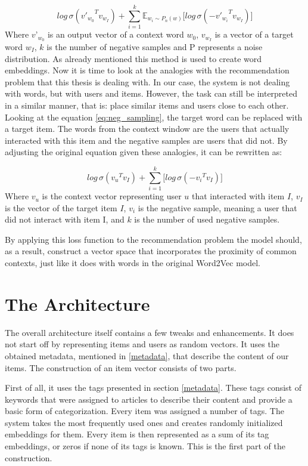 \begin{equation} \label{eq:neg_sampling}
    log \, \sigma ({{v'}_{w_0}}^T v_{w_I}) + \sum_{i=1}^k \mathbb{E}_{w_i \sim P_n(w)} \Big[log \, \sigma (-{{v'}_{w_i}}^T v_{w_I})\Big]
\end{equation}
Where ${v’}_{w_0}$ is an output vector of a context word $w_0$, $v_{w_I}$ is a vector of a target word $w_I$, $k$ is the number of negative samples and P represents a noise distribution. 
As already mentioned this method is used to create word embeddings. Now it is time to look at the analogies with the recommendation problem that this thesis is dealing with. 
In our case, the system is not dealing with words, but with users and items. However, the task can still be interpreted in a similar manner, that is: place similar items and users close to each other. Looking at the equation \ref{eq:neg_sampling}, the target word can be replaced with a target item. The words from the context window are the users that actually interacted with this item and the negative samples are users that did not. By adjusting the original equation given these analogies, it can be rewritten as:

\begin{equation} \label{our_ns}
    log \, \sigma ({v_{u}}^T v_I) + \sum_{i=1}^k \Big[ log \, \sigma ({-v_i}^T v_I) \Big]
\end{equation}
Where $v_u$ is the context vector representing user $u$ that interacted with item $I$, $v_I$ is the vector of the target item $I$, $v_i$ is the negative sample, meaning a user that did not interact with item I, and $k$ is the number of used negative samples.

By applying this loss function to the recommendation problem the model should, as a result, construct a vector space that incorporates the proximity of common contexts, just like it does with words in the original Word2Vec model.

\section*{The Architecture}
The overall architecture itself contains a few tweaks and enhancements. It does not start off by representing items and users as random vectors. It uses the obtained metadata, mentioned in \ref{metadata}, that describe the content of our items. The construction of an item vector consists of two parts.

First of all, it uses the tags presented in section \ref{metadata}. These tags consist of keywords that were assigned to articles to describe their content and provide a basic form of categorization. Every item was assigned a number of tags. The system takes the most frequently used ones and creates randomly initialized embeddings for them. Every item is then represented as a sum of its tag embeddings, or zeros if none of its tags is known. This is the first part of the construction. 

